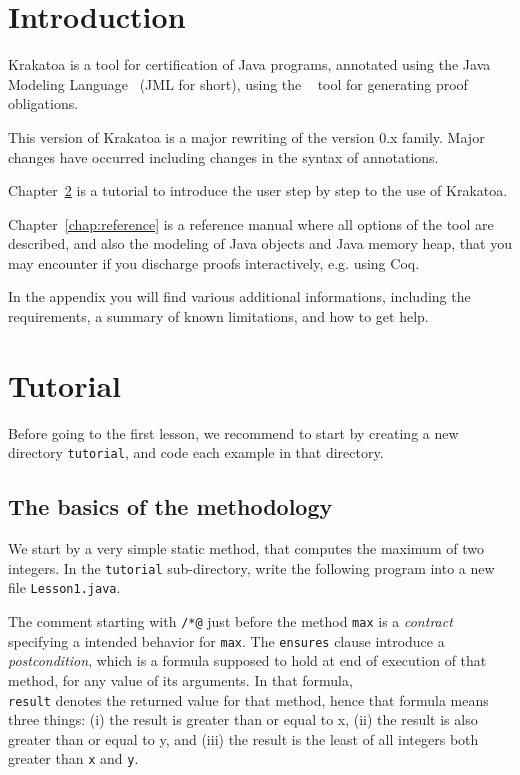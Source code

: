 \documentclass[a4paper,11pt,twoside,openright]{report}
\begin{document}
\sloppy
{}



\tableofcontents

\chapter{Introduction}

Krakatoa is a tool for certification of Java programs, annotated using
the Java Modeling Language~\cite{leavens00preliminary} (JML for
short), using the \Why{}~\cite{why} tool for generating proof
obligations.

This version \whyversion{} of Krakatoa is a major rewriting of  
the version 0.x family. Major changes have occurred including changes in the syntax of annotations.

Chapter~\ref{chap:tutorial} is a tutorial to introduce the user step
by step to the use of Krakatoa. 

Chapter~\ref{chap:reference} is a reference manual where all options
of the tool are described, and also the modeling of Java objects and
Java memory heap, that you may encounter if you discharge proofs interactively, e.g. using Coq.

In the appendix you will find various additional informations,
including the requirements, a summary of known limitations, and how to
get help. 


\chapter{Tutorial}
\label{chap:tutorial}

Before going to the first lesson, we recommend to start by creating a new
directory \verb|tutorial|, and code each example in that directory. 

\section{The basics of the methodology}

We start by a very simple static method, that computes the maximum of
two integers. In the \verb|tutorial| sub-directory, write the
following \Java{} program 
into a new file \verb|Lesson1.java|.

The comment starting with \verb|/*@| just before the method
\texttt{max} is a \emph{contract} specifying a intended behavior for
\texttt{max}. 
The \texttt{ensures} clause introduce a
\emph{postcondition}, which is a formula supposed to hold at end of
execution of that method, for any value of its arguments. In that
formula, \texttt{\\result} denotes the returned value for that method,
hence that formula means three things: (i) the result is greater than or
equal to x, (ii) the result is also greater than or
equal to y, and (iii) the result is the least of all integers both
greater than \texttt{x} and \texttt{y}.
\end{document}
